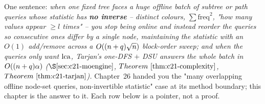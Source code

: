 

One sentence: \emph{when one fixed tree faces a huge offline batch of subtree or
path queries whose statistic has \textbf{no inverse} -- distinct colours,
\(\sum\mathrm{freq}^2\), "how many values appear \(\ge l\) times" -- you stop
being online and instead \emph{reorder} the queries so consecutive ones differ by
a single node, maintaining the statistic with an \(O(1)\) add/remove across a
\(O((n+q)\sqrt n)\) block-order sweep; and when the queries only want
\(\operatorname{lca}\), Tarjan's one-DFS \(+\) DSU answers the whole batch in
\(O((n+q)\alpha)\) (\(\secref{c21-moengine}\), \(\thmref{c21-complexity}\),
\(\thmref{c21-tarjan}\)).} Chapter~26 handed you the "many overlapping offline
node-set queries, non-invertible statistic" case at its method boundary; this
chapter is the answer to it. Each row below is a pointer, not a proof.

